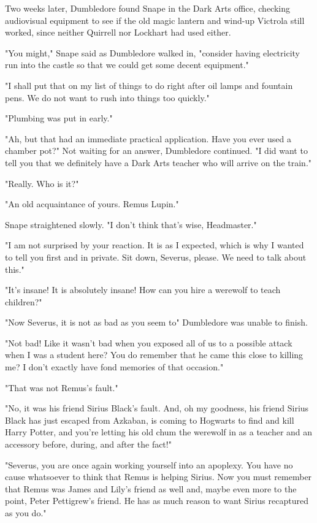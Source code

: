 Two weeks later, Dumbledore found Snape in the Dark Arts office, checking audiovisual equipment to see if the old magic lantern and wind-up Victrola still worked, since neither Quirrell nor Lockhart had used either.

"You might," Snape said as Dumbledore walked in, "consider having electricity run into the castle so that we could get some decent equipment."

"I shall put that on my list of things to do right after oil lamps and fountain pens. We do not want to rush into things too quickly."

"Plumbing was put in early."

"Ah, but that had an immediate practical application. Have you ever used a chamber pot?" Not waiting for an answer, Dumbledore continued. "I did want to tell you that we definitely have a Dark Arts teacher who will arrive on the train."

"Really. Who is it?"

"An old acquaintance of yours. Remus Lupin."

Snape straightened slowly. "I don't think that's wise, Headmaster."

"I am not surprised by your reaction. It is as I expected, which is why I wanted to tell you first and in private. Sit down, Severus, please. We need to talk about this."

"It's insane! It is absolutely insane! How can you hire a werewolf to teach children?"

"Now Severus, it is not as bad as you seem to{\el}" Dumbledore was unable to finish.

"Not bad! Like it wasn't bad when you exposed all of us to a possible attack when I was a student here? You do remember that he came this close to killing me? I don't exactly have fond memories of that occasion."

"That was not Remus's fault."

"No, it was his friend Sirius Black's fault. And, oh my goodness, his friend Sirius Black has just escaped from Azkaban, is coming to Hogwarts to find and kill Harry Potter, and you're letting his old chum the werewolf in as a teacher and an accessory before, during, and after the fact!"

"Severus, you are once again working yourself into an apoplexy. You have no cause whatsoever to think that Remus is helping Sirius. Now you must remember that Remus was James and Lily's friend as well and, maybe even more to the point, Peter Pettigrew's friend. He has as much reason to want Sirius recaptured as you do."

